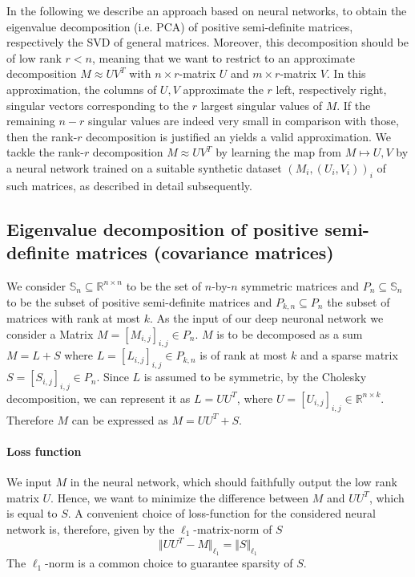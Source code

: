In the following we describe an approach based on neural networks, to obtain the eigenvalue decomposition (i.e. PCA) of positive semi-definite matrices, respectively the SVD of general matrices. Moreover, this decomposition should be of low rank $r<n$, meaning that we want to restrict to an approximate decomposition $M \approx UV^T$ with $n\times r$-matrix $U$ and $m\times r$-matrix $V$. In this approximation, the columns of $U,V$ approximate the $r$ left, respectively right, singular vectors corresponding to the $r$ largest singular values of $M$. If the remaining $n-r$ singular values are indeed very small in comparison with those, then the rank-$r$ decomposition is justified an yields a valid approximation. We tackle the rank-$r$ decomposition $M \approx UV^T$ by learning the map from $M \mapsto U,V$ by a neural network trained on a suitable synthetic dataset $(M_i,(U_i,V_i))_i$ of such matrices, as described in detail subsequently. 



\subsection{Eigenvalue decomposition of positive semi-definite matrices (covariance matrices)}
 
We consider $\mathbb{S}_n \subseteq \mathbb{R}^{n \times n}$ to be the set of $n$-by-$n$ symmetric matrices and $P_n\subseteq \mathbb{S}_n$ to be the subset of positive semi-definite matrices and $P_{k,n} \subseteq P_n$ the subset of matrices with rank at most $k$. As the input of our deep neuronal network we consider a Matrix $M = [M_{i,j}]_{i,j} \in P_n$. $M$ is to be decomposed as a sum $M = L + S$ where $L = [L_{i,j}]_{i,j} \in P_{k,n}$ is of rank at most $k$ and a sparse matrix $S = [S_{i,j}]_{i,j} \in P_n$. Since $L$ is assumed to be symmetric, by the Cholesky decomposition, we can represent it as $L=UU^T$, where $U = [U_{i,j}]_{i,j} \in \mathbb{R}^{n \times k}$. Therefore $M$ can be expressed as $M = UU^T + S$.

\paragraph{Loss function}
We input $M$ in the neural network, which should faithfully output the low rank matrix $U$. Hence, we want to minimize the difference between $M$ and $UU^T$, which is equal to $S$. A convenient choice of loss-function for the considered neural network is, therefore, given by the $\ell_1$-matrix-norm of $S$
\[
\Vert UU^T - M \Vert_{\ell_1} = \Vert S \Vert_{\ell_1}
\]
The $\ell_1$-norm is a common choice to guarantee sparsity of $S$.

